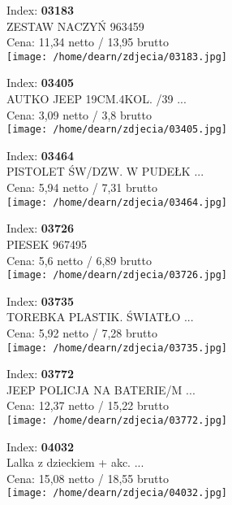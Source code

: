 {Index: \textbf{03183}\\
ZESTAW NACZYŃ 963459\\
Cena: 11,34 netto / 13,95 brutto\\
  \texttt{[image: /home/dearn/zdjecia/03183.jpg]}}\newline\newline

{Index: \textbf{03405}\\
AUTKO JEEP 19CM.4KOL. /39 ...\\
Cena: 3,09 netto / 3,8 brutto\\
  \texttt{[image: /home/dearn/zdjecia/03405.jpg]}}\newline\newline

{Index: \textbf{03464}\\
PISTOLET ŚW/DZW. W PUDEŁK ...\\
Cena: 5,94 netto / 7,31 brutto\\
  \texttt{[image: /home/dearn/zdjecia/03464.jpg]}}\newline\newline

{Index: \textbf{03726}\\
PIESEK 967495\\
Cena: 5,6 netto / 6,89 brutto\\
  \texttt{[image: /home/dearn/zdjecia/03726.jpg]}}\newline\newline

{Index: \textbf{03735}\\
TOREBKA PLASTIK. ŚWIATŁO  ...\\
Cena: 5,92 netto / 7,28 brutto\\
  \texttt{[image: /home/dearn/zdjecia/03735.jpg]}}\newline\newline

{Index: \textbf{03772}\\
JEEP POLICJA NA BATERIE/M ...\\
Cena: 12,37 netto / 15,22 brutto\\
  \texttt{[image: /home/dearn/zdjecia/03772.jpg]}}\newline\newline

{Index: \textbf{04032}\\
Lalka z dzieckiem + akc.  ...\\
Cena: 15,08 netto / 18,55 brutto\\
  \texttt{[image: /home/dearn/zdjecia/04032.jpg]}}\newline\newline

